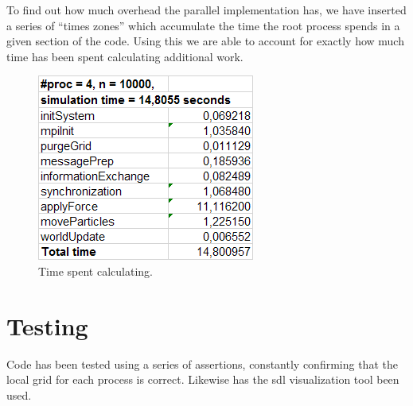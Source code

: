 To find out how much overhead the parallel implementation has, we have inserted a series of ``times zones'' which accumulate the time the root process spends in a given section of the code. Using this we are able to account for exactly how much time has been spent calculating additional work.

\begin{figure}[H]
  \centering
  \begin{minipage}[b]{0.6\textwidth}
    \includegraphics[width=\textwidth]{time.png}
    \caption{Time spent calculating.}
  \end{minipage}
\end{figure}

\section{Testing}
Code has been tested using a series of assertions, constantly confirming that the local grid for each process is correct. Likewise has the sdl visualization tool been used.